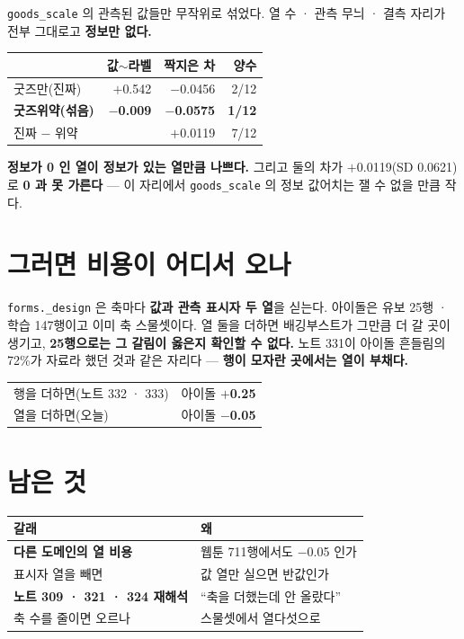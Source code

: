 \documentclass[10pt]{article}
\begin{document}
\texttt{goods\_scale} 의 관측된 값들만 무작위로 섞었다. 열 수 · 관측 무늬 ·
결측 자리가 전부 그대로고 \textbf{정보만 없다.}

\begin{center}\footnotesize
\begin{tabular}{lrrr}
\hline
 & 값$\sim$라벨 & 짝지은 차 & 양수 \\
\hline
굿즈만(진짜) & $+$0.542 & $-$0.0456 & 2/12 \\
\textbf{굿즈위약(섞음)} & \textbf{$-$0.009} & \textbf{$-$0.0575} & \textbf{1/12} \\
\hline
진짜 $-$ 위약 & & $+$0.0119 & 7/12 \\
\hline
\end{tabular}
\end{center}

\textbf{정보가 0 인 열이 정보가 있는 열만큼 나쁘다.} 그리고 둘의 차가
$+$0.0119(SD 0.0621)로 \textbf{0 과 못 가른다} --- 이 자리에서
\texttt{goods\_scale} 의 정보 값어치는 잴 수 없을 만큼 작다.

\section{그러면 비용이 어디서 오나}

\texttt{forms.\_design} 은 축마다 \textbf{값과 관측 표시자 두 열}을 싣는다.
아이돌은 유보 25행 · 학습 147행이고 이미 축 스물셋이다. 열 둘을 더하면
배깅부스트가 그만큼 더 갈 곳이 생기고, \textbf{25행으로는 그 갈림이 옳은지
확인할 수 없다.} 노트 331이 아이돌 흔들림의 72\%가 자료라 했던 것과 같은
자리다 --- \textbf{행이 모자란 곳에서는 열이 부채다.}

\begin{center}\small
\begin{tabular}{ll}
\hline
행을 더하면(노트 332 · 333) & 아이돌 \textbf{$+$0.25} \\
열을 더하면(오늘) & 아이돌 \textbf{$-$0.05} \\
\hline
\end{tabular}
\end{center}

\section{남은 것}
\begin{center}\footnotesize
\begin{tabular}{ll}
\hline
갈래 & 왜 \\
\hline
\textbf{다른 도메인의 열 비용} & 웹툰 711행에서도 $-$0.05 인가 \\
표시자 열을 빼면 & 값 열만 실으면 반값인가 \\
\textbf{노트 309 · 321 · 324 재해석} & ``축을 더했는데 안 올랐다'' \\
축 수를 줄이면 오르나 & 스물셋에서 열다섯으로 \\
\hline
\end{tabular}
\end{center}
\end{document}
